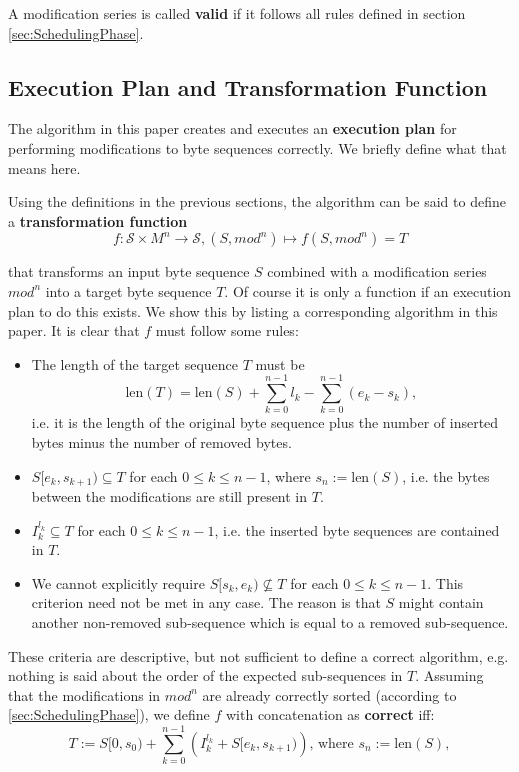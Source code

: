 \documentclass[english, 10pt, openright, twocolumn, landscape, twoside, notitlepage, a4paper, pdftex]		
{article}
\begin{document}
A modification series is called \textbf{valid} if it follows all rules defined in section \ref{sec:SchedulingPhase}.


\subsection{Execution Plan and Transformation Function}%
\label{sec:ExecutionPlanandTransformationFunction}%

The algorithm in this paper creates and executes an \textbf{execution plan} for performing modifications to byte sequences correctly. We briefly define what that means here.

Using the definitions in the previous sections, the algorithm can be said to define a \textbf{transformation function} 
\[f:\mathcal{S}\times M^{n} \rightarrow \mathcal{S}, (S,mod^{n}) \mapsto f(S,mod^{n})=T\]

that transforms an input byte sequence $S$ combined with a modification series $mod^{n}$ into a target byte sequence $T$. Of course it is only a function if an execution plan to do this exists. We show this by listing a corresponding algorithm in this paper. It is clear that $f$ must follow some rules:
\begin{itemize}
\item The length of the target sequence $T$ must be \[\text{len}(T)=\text{len}(S)+\sum_{k=0}^{n-1}{l_{k}}-\sum_{k=0}^{n-1}{\left(e_{k}-s_{k}\right)},\]
i.e. it is the length of the original byte sequence plus the number of inserted bytes minus the number of  removed bytes.
\item $S[e_{k},s_{k+1})\subseteq T$ for each $0\leq k\leq n-1$, where $s_{n}:=\text{len}(S)$, i.e. the bytes between the modifications are still present in $T$.
\item $I_{k}^{l_{k}}\subseteq T$ for each $0\leq k\leq n-1$, i.e. the inserted byte sequences are contained in $T$.
\item We cannot explicitly require $S[s_{k},e_{k})\not\subseteq T$ for each $0\leq k\leq n-1$. This criterion need not be met in any case. The reason is that $S$ might contain another non-removed sub-sequence which is equal to a removed sub-sequence.
\end{itemize}

These criteria are descriptive, but not sufficient to define a correct algorithm, e.g. nothing is said about the order of the expected sub-sequences in $T$. Assuming that the modifications in $mod^{n}$ are already correctly sorted (according to \ref{sec:SchedulingPhase}), we define $f$ with concatenation as \textbf{correct} iff:
\[T:=S[0,s_{0})+\sum_{k=0}^{n-1}{\left(I_{k}^{l_{k}}+S[e_{k},s_{k+1})\right)}\text{, where }s_{n}:=\text{len}(S),\]
\end{document}

